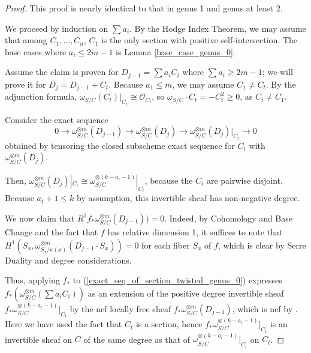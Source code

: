 \begin{proof}
This proof is nearly identical to that in genus 1 and genus at least 2.

We proceed by induction on $\sum a_i$.
By the Hodge Index Theorem, we may assume that among $C_1,\ldots,C_n$, $C_1$ is the only section with positive self-intersection.
The base cases where $a_i\le 2m-1$ is Lemma \ref{base_case_genus_0}.

Assume the claim is proven for $D_{j-1}=\sum a_iC_i$ where $\sum a_i\ge 2m-1$; we will prove it for $D_{j}=D_{j-1}+C_t$.
Because $a_{1}\le m$, we may assume $C_1\neq C_t$.
By the adjunction formula, $\omega_{S/C}(C_t)|_{C_t}\cong\mathcal{O}_{C_t}$, so $\omega_{S/C}\cdot C_t=-C_t^2\ge0$, as $C_t\neq C_1$.

Consider the exact sequence
\begin{equation*}\label{exact_seq_of_section_twisted_genus_0}
0\to\omega_{S/C}^{\otimes m}(D_{j-1})\to\omega_{S/C}^{\otimes m}(D_j)\to \omega_{S/C}^{\otimes m}(D_j)|_{C_t}\to0
\end{equation*}
obtained by tensoring the closed subscheme exact sequence for $C_t$ with $\omega_{S/C}^{\otimes m}(D_j)$.

Then, $\omega_{S/C}^{\otimes m}(D_j)|_{C_t}\cong \omega_{S/C}^{\otimes (k-a_{t}-1)}|_{C_t}$, because the $C_i$ are pairwise disjoint.
Because $a_{t}+1\le k$ by assumption, this invertible sheaf has non-negative degree.

We now claim that $R^{1}f_{*}\omega_{S/C}^{\otimes m}(D_{j-1}))=0$.
Indeed, by Cohomology and Base Change and the fact that $f$ has relative dimension 1, it suffices to note that $H^{1}(S_x,\omega_{S_x/\kappa(x)}^{\otimes m}(D_{j-1}\cdot S_x))=0$ for each fiber $S_x$ of $f$, which is clear by Serre Duality and degree considerations.

Thus, applying $f_{*}$ to (\ref{exact_seq_of_section_twisted_genus_0}) expresses $f_{*}(\omega_{S/C}^{\otimes m}(\sum a_iC_i))$ as an extension of the positive degree invertible sheaf $f_{*}\omega_{S/C}^{\otimes (k-a_{t}-1)}|_{C_t}$ by the nef locally free sheaf $f_{*}\omega_{S/C}^{\otimes m}(D_{j-1})$, which is nef by .
Here we have used the fact that $C_t$ is a section, hence $f_{*}\omega_{S/C}^{\otimes (k-a_{t}-1)}|_{C_t}$ is an invertible sheaf on $C$ of the same degree as that of $\omega_{S/C}^{\otimes (k-a_{t}-1)}|_{C_t}$ on $C_t$.
\end{proof}

